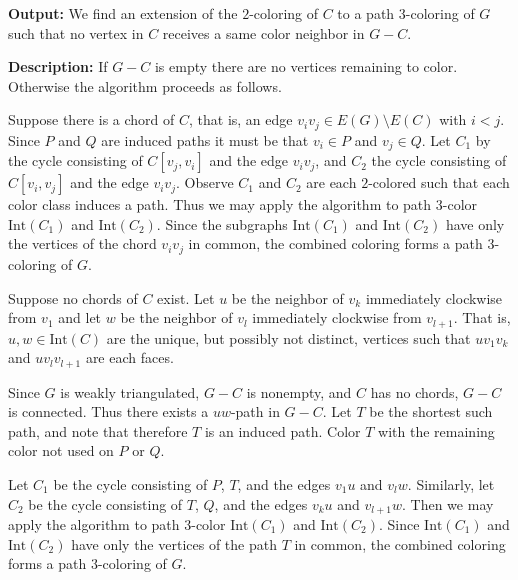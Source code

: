 \documentclass[letterpaper, 12pt]{article}
\theoremstyle{definition}
\theoremstyle{definition}
\theoremstyle{thm}
\theoremstyle{definition}
\begin{document}
\noindent\textbf{Output:} We find an extension of the $2$-coloring of $C$ to
a path $3$-coloring of $G$ such that no vertex in $C$ receives a same color
neighbor in $G-C$.

\noindent\textbf{Description:} If $G-C$ is empty there are no vertices remaining
to color. Otherwise the algorithm proceeds as follows.

Suppose there is a chord of $C$, that is, an edge $v_iv_j\in E(G)\setminus E(C)$
with $i<j$. Since $P$ and $Q$ are induced paths it must be that $v_i\in P$ and
$v_j\in Q$. Let $C_1$ by the cycle consisting of $C[v_j,v_i]$ and the
edge $v_iv_j$, and $C_2$ the cycle consisting of $C[v_i,v_j]$ and the edge
$v_iv_j$. Observe $C_1$ and $C_2$ are each $2$-colored
such that each color class induces a path. Thus we may apply the algorithm to
path $3$-color $\text{Int}(C_1)$ and $\text{Int}(C_2)$. Since the subgraphs
$\text{Int}(C_1)$ and $\text{Int}(C_2)$ have only the vertices of the chord
$v_iv_j$ in common, the combined coloring forms a path $3$-coloring of $G$.

Suppose no chords of $C$ exist. Let $u$ be the neighbor of $v_k$ immediately
clockwise from $v_1$ and let $w$ be the neighbor of $v_l$ immediately clockwise
from $v_{l+1}$. That is, $u,w\in\text{Int}(C)$ are the unique, but possibly not
distinct, vertices such that $uv_1v_k$ and $uv_lv_{l+1}$ are each faces.

Since $G$ is weakly triangulated, $G-C$ is nonempty,
and $C$ has no chords, $G-C$ is connected. Thus there exists a $uw$-path in
$G-C$. Let $T$ be the shortest such path, and note that therefore $T$ is
an induced path. Color $T$ with the remaining color not used on $P$ or $Q$.

Let $C_1$ be the cycle
consisting of $P$, $T$, and the edges $v_1u$ and $v_lw$. Similarly, let $C_2$ be
the cycle consisting of $T$, $Q$, and the edges $v_ku$ and $v_{l+1}w$. Then we
may apply the algorithm to path $3$-color $\text{Int}(C_1)$ and
$\text{Int}(C_2)$. Since $\text{Int}(C_1)$ and $\text{Int}(C_2)$ have only the
vertices of the path $T$ in common, the combined coloring forms a path
$3$-coloring of $G$.\\
\end{document}
